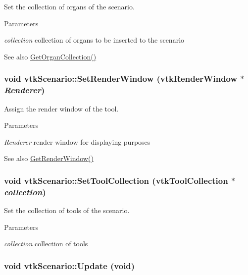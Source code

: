 Set the collection of organs of the scenario. 
\begin{DoxyParams}{Parameters}
\item[{\em collection}]collection of organs to be inserted to the scenario \end{DoxyParams}
\begin{DoxySeeAlso}{See also}
\hyperlink{classvtkScenario_a9e518be8bb47a65ae2b8a8ef02f579df}{GetOrganCollection()} 
\end{DoxySeeAlso}
\hypertarget{classvtkScenario_a65e86f64884268d0e100345d472a35c8}{
\subsubsection[{SetRenderWindow}]{\setlength{\rightskip}{0pt plus 5cm}void vtkScenario::SetRenderWindow (vtkRenderWindow $\ast$ {\em Renderer})}}
\label{classvtkScenario_a65e86f64884268d0e100345d472a35c8}


Assign the render window of the tool. 
\begin{DoxyParams}{Parameters}
\item[{\em Renderer}]render window for displaying purposes \end{DoxyParams}
\begin{DoxySeeAlso}{See also}
\hyperlink{classvtkScenario_a4a3cb31864be1da763b5acb3377a32db}{GetRenderWindow()} 
\end{DoxySeeAlso}
\hypertarget{classvtkScenario_a50915d4f98502e2b99745b99e89d0522}{
\subsubsection[{SetToolCollection}]{\setlength{\rightskip}{0pt plus 5cm}void vtkScenario::SetToolCollection ({\bf vtkToolCollection} $\ast$ {\em collection})}}
\label{classvtkScenario_a50915d4f98502e2b99745b99e89d0522}


Set the collection of tools of the scenario. 
\begin{DoxyParams}{Parameters}
\item[{\em collection}]collection of tools \end{DoxyParams}
\hypertarget{classvtkScenario_aac52c3827cbdc1d3db03fb313f664cc0}{
\subsubsection[{Update}]{\setlength{\rightskip}{0pt plus 5cm}void vtkScenario::Update (void)}}
\label{classvtkScenario_aac52c3827cbdc1d3db03fb313f664cc0}


